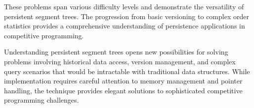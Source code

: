 
These problems span various difficulty levels and demonstrate the versatility of persistent segment trees. The progression from basic versioning to complex order statistics provides a comprehensive understanding of persistence applications in competitive programming.

Understanding persistent segment trees opens new possibilities for solving problems involving historical data access, version management, and complex query scenarios that would be intractable with traditional data structures. While implementation requires careful attention to memory management and pointer handling, the technique provides elegant solutions to sophisticated competitive programming challenges.

